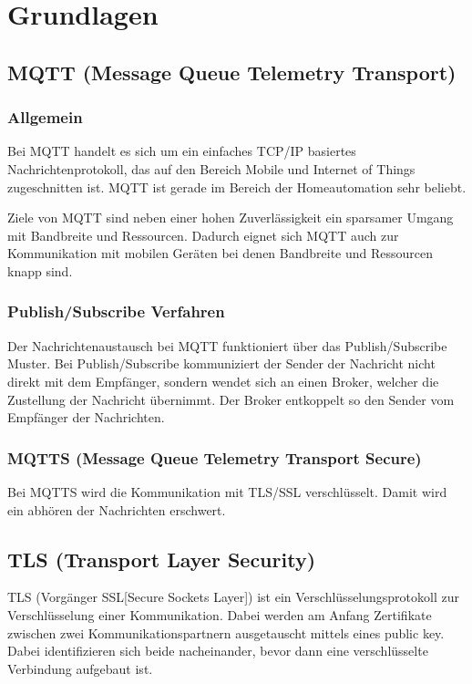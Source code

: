 \chapter{Grundlagen}
\label{cha:Grundlagen}

\section{MQTT (Message Queue Telemetry Transport)}

\subsection{Allgemein}
Bei MQTT handelt es sich um ein einfaches TCP/IP basiertes Nachrichtenprotokoll, das auf den Bereich Mobile und Internet of Things zugeschnitten ist. MQTT ist gerade im Bereich der Homeautomation sehr beliebt.

Ziele von MQTT sind neben einer hohen Zuverlässigkeit ein sparsamer Umgang mit Bandbreite und Ressourcen. Dadurch eignet sich MQTT auch zur Kommunikation mit mobilen Geräten bei denen Bandbreite und Ressourcen knapp sind.

\subsection{Publish/Subscribe Verfahren}
Der Nachrichtenaustausch bei MQTT funktioniert über das Publish/Subscribe Muster. Bei Publish/Subscribe kommuniziert der Sender der Nachricht nicht direkt mit dem Empfänger, sondern wendet sich an einen Broker, welcher die Zustellung der Nachricht übernimmt. Der Broker entkoppelt so den Sender vom Empfänger der Nachrichten.

\subsection{MQTTS (Message Queue Telemetry Transport Secure)}
Bei MQTTS wird die Kommunikation mit TLS/SSL verschlüsselt. Damit wird ein abhören der Nachrichten erschwert.

\section{TLS (Transport Layer Security)}
TLS (Vorgänger SSL[Secure Sockets Layer]) ist ein Verschlüsselungsprotokoll zur Verschlüsselung einer Kommunikation. Dabei werden am Anfang Zertifikate zwischen zwei Kommunikationspartnern ausgetauscht mittels eines public key. Dabei identifizieren sich beide nacheinander, bevor dann eine verschlüsselte Verbindung aufgebaut ist.

